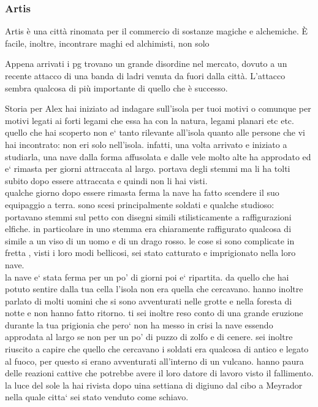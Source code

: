 \documentclass[10pt,twoside,twocolumn]{article}
\begin{document}
\subsubsection{Artis}
Artis \`e una citt\`a rinomata per il commercio di sostanze magiche e
alchemiche. \`E facile, inoltre, incontrare maghi ed alchimisti, non solo
\begin{quotebox}
  Appena arrivati i pg trovano un grande disordine nel mercato, dovuto a un recente attacco di
  una banda di ladri venuta da fuori dalla citt\`a. L'attacco sembra qualcosa di pi\`u
  importante di quello che \`e successo.
\end{quotebox}
\begin{commentbox}{Storia per Alex}
  hai iniziato ad indagare sull'isola per tuoi motivi o comunque per motivi legati ai forti legami che essa ha con la natura, legami planari etc etc. quello che hai scoperto non e` tanto rilevante all'isola quanto alle persone che vi hai incontrato: non eri solo nell'isola. infatti, una volta arrivato e iniziato a studiarla, una nave dalla forma affusolata e dalle vele molto alte ha approdato ed e` rimasta per giorni attraccata al largo. portava degli stemmi ma li ha tolti subito dopo essere attraccata e quindi non li hai visti. \\
  qualche giorno dopo essere rimasta ferma la nave ha fatto scendere il suo equipaggio a terra. sono scesi principalmente soldati e qualche studioso: portavano stemmi sul petto con disegni simili stilisticamente a raffigurazioni elfiche. in particolare in uno stemma era chiaramente raffigurato qualcosa di simile a un viso di un uomo e di un drago rosso. le cose si sono complicate in fretta , visti i loro modi bellicosi, sei stato catturato e imprigionato nella loro nave. \\
  la nave e` stata ferma per un po' di giorni poi e` ripartita. da quello che hai potuto sentire dalla tua cella l'isola non era quella che cercavano. hanno inoltre parlato di molti uomini che si sono avventurati nelle grotte e nella foresta di notte e non hanno fatto ritorno. ti sei inoltre reso conto di una grande eruzione durante la tua prigionia che pero` non ha messo in crisi la nave essendo approdata al largo se non per un po' di puzzo di zolfo e di cenere. sei inoltre riuscito a capire che quello che cercavano i soldati era qualcosa di antico e legato al fuoco, per questo si erano avventurati all'interno di un vulcano. hanno paura delle reazioni cattive che potrebbe avere il loro datore di lavoro visto il fallimento. la luce del sole la hai rivista dopo uina settiana di digiuno dal cibo a Meyrador nella quale citta` sei stato venduto come schiavo. \\

\end{commentbox}
\end{document}

